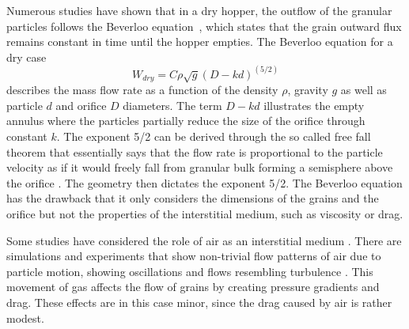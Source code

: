 \documentclass[twoside,twocolumn,9pt]{article}
\begin{document}
Numerous studies have shown that in a dry hopper, the outflow 
of the granular particles follows the Beverloo equation~\cite{Beverloo1961,Madrid2017EPJ,AshourSM17}, which
states that the grain outward flux remains constant in time until the hopper empties.
The Beverloo equation for a dry case
%
\begin{equation}
W_{dry} = C \rho \sqrt{g}(D-kd)^{(5/2)}
\end{equation}
%
describes the mass flow rate as a function of the density $\rho$, gravity $g$ as well as particle $d$ and orifice $D$ diameters.
The term $D-kd$ illustrates the empty annulus where the particles partially reduce the size of the orifice through constant $k$. 
The exponent 5/2 can be derived through the so called free fall theorem 
that essentially says that the flow rate is proportional to the particle 
velocity as if it would freely fall from granular bulk forming a semisphere above the orifice 
\cite{Tian2015,Janda2012,Mankoc2007}. 
The geometry then dictates the exponent 5/2. 
The Beverloo equation has the drawback that it only considers the dimensions of the grains and the orifice but not the properties of the interstitial medium, such as viscosity or drag.


Some studies have considered the role of air as an interstitial 
medium \cite{Yuu2011Mat}. There are simulations and experiments that 
show non-trivial flow patterns of air due to particle motion, showing 
oscillations \cite{WuX.L.Maloy1993,Bertho2002} and flows resembling  
turbulence \cite{Hilton2011}. This movement of gas affects the flow of 
grains by creating pressure gradients and drag. 
These effects are in this case minor, since the drag caused
by air is rather modest.
\end{document}

